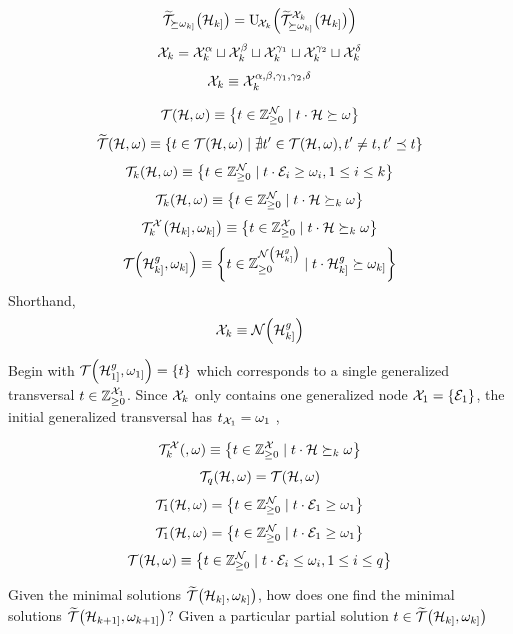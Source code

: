 \documentclass[aps, 10pt, english, twoside, twocolumn, pra, nofootinbib, tightenlines, longbibliography, superscriptaddress]{revtex4-1}
\begin{document}
    \[ \widetilde {\s T}_{\succeq \w_{k]}}\br{\s H_{k]}} = \mathrm{U}_{\!\s X_{k}}\br{\widetilde {\s T}_{\succeq \w_{k]}}^{\s X_{k}}\br{\s H_{k]}}} \]
    \[ \mathcal{X}_{k} = \mathcal{X}_{k}^{\alpha} \sqcup \mathcal{X}_{k}^{\beta} \sqcup \mathcal{X}_{k}^{\gamma_1} \sqcup \mathcal{X}_{k}^{\gamma_2} \sqcup \mathcal{X}_{k}^{\delta} \]
    \[ \mathcal{X}_{k} \equiv \mathcal{X}_{k}^{\alpha,\beta,\gamma_1,\gamma_2,\delta} \]
    \begin{definition}
        \[ \s T\br{\s H, \w} \defined \bc{t \in \Z_{\geq 0}^{\nodes} \mid t \cdot \s H \succeq \w} \]
        \[ \widetilde {\s T}\br{\s H, \w} \defined \bc{t \in \s T\br{\s H, \w} \mid \nexists t' \in \s T\br{\s H, \w}, t' \neq t, t' \preceq t} \]
        \[ \s T_{k}\br{\s H, \w} \defined \bc{t \in \Z_{\geq 0}^{\nodes} \mid t \cdot \edges_i \geq \w_i, 1 \leq i \leq k} \]
        \[ \s T_{k}\br{\s H, \w} \defined \bc{t \in \Z_{\geq 0}^{\nodes} \mid t \cdot \s H \succeq_{k} \w} \]
        \[ \s T_{k}^{\s X}\br{\s H_{k]}, \w_{k]}} \defined \bc{t \in \Z_{\geq 0}^{\s X} \mid t \cdot \s H \succeq_{k} \w} \]
        \[ \s T\br{\s H^{g}_{k]}, \w_{k]}} \defined \bc{t \in \Z_{\geq 0}^{\nodes\br{\s H_{k]}^{g}}} \mid t \cdot \s H^{g}_{k]} \succeq \w_{k]}} \]
        Shorthand,
        \[ \s X_k \defined \nodes\br{\s H_{k]}^{g}} \]

        Begin with $\s T\br{\s H^{g}_{1]}, \w_{1]}} = \bc{t}$ which corresponds to a single generalized transversal $t \in {\mathbb{Z}}_{\geq 0}^{\mathcal{X}_1}$. Since $\mathcal{X}_k$ only contains one generalized node $\s X_1 = \bc{\edges_1}$, the initial generalized transversal has $t_{\mathcal{X}_1} = \omega_1$ ,
        \[  \]

        \[ \s T_{k}^{\s X}\br{, \w} \defined \bc{t \in \Z_{\geq 0}^{\s X} \mid t \cdot \s H \succeq_{k} \w} \]
        \[ \s T_{q}\br{\s H, \w} = \s T\br{\s H, \w} \]
        \[ \s T_{1}\br{\s H, \w} = \bc{t \in \Z_{\geq 0}^{\nodes} \mid t \cdot \edges_1 \geq \w_1} \]
        \[ \s T_{1}\br{\s H, \w} = \bc{t \in \Z_{\geq 0}^{\nodes} \mid t \cdot \edges_1 \geq \w_1} \]
        \[ \s T\br{\s H, \w} \defined \bc{t \in \Z_{\geq 0}^{\nodes} \mid t \cdot \edges_i \leq \w_i, 1 \leq i \leq q} \]
    \end{definition}

    Given the minimal solutions $\widetilde {\s T}\br{\s H_{k]}, \w_{k]}}$, how does one find the minimal solutions $\widetilde {\s T}\br{\s H_{k+1]}, \w_{k+1]}}$? Given a particular partial solution $t \in \widetilde {\s T}\br{\s H_{k]}, \w_{k]}}$
\end{document}
